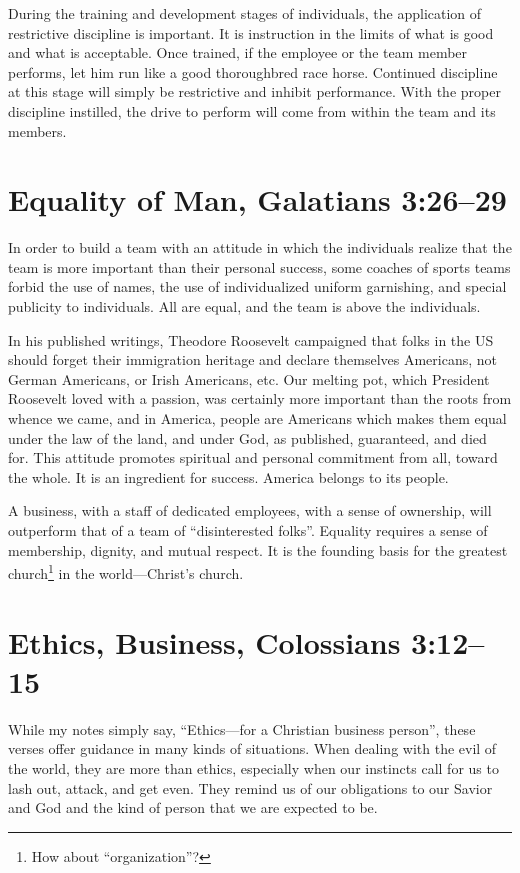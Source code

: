 \documentclass[12pt]{memoir}
\begin{document}
During the training and development stages of individuals, the application of restrictive discipline is important.
It is instruction in the limits of what is good and what is acceptable. 
Once trained, if the employee or the team member performs, let him run like a good thoroughbred race horse.
Continued discipline at this stage will simply be restrictive and inhibit performance.
With the proper discipline instilled, the drive to perform will come from within the team and its members.

\section[Equality of Man]{Equality of Man, Galatians 3:26--29}

In order to build a team with an attitude in which the individuals
realize that the team is more important than their personal success,
some coaches of sports teams forbid the use of names, the use of individualized
uniform garnishing, and special publicity to individuals. All are
equal, and the team is above the individuals.

In his published writings, Theodore Roosevelt campaigned that folks in the US should forget their immigration heritage and declare themselves
Americans, not German Americans, or Irish Americans, etc. Our melting pot, which President Roosevelt loved with a passion, was certainly more important than the roots from whence we came, and in America, people are Americans which makes them equal under the law of the land,
and under God, as published, guaranteed, and died for.
This attitude promotes spiritual and personal commitment from all, toward the whole.
It is an ingredient for success.
America belongs to its people.

A business, with a staff of dedicated employees, with a sense of ownership,
will outperform that of a team of ``disinterested folks''. Equality
requires a sense of membership, dignity, and mutual respect. It is
the founding basis for the greatest church\footnote{How about ``organization''?} in the world---Christ's church.

\section[Ethics, Business]{Ethics, Business, Colossians 3:12--15}

While my notes simply say, ``Ethics---for a Christian business person'',
these verses offer guidance in many kinds of situations. When dealing
with the evil of the world, they are more than ethics, especially
when our instincts call for us to lash out, attack, and get even.
They remind us of our obligations to our Savior and God and the kind of person that we are expected to be.
\end{document}
